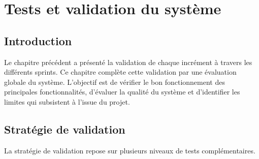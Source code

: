

\chapter{Tests et validation du système}

\label{cha:tests-validation}


\begingroup

\let\clearpage\relax

\startcontents[chapters]


\endgroup

\newpage


\section*{Introduction}

\justifying



Le chapitre précédent a présenté la validation de chaque incrément à travers les différents sprints. Ce chapitre complète cette validation par une évaluation globale du système. L'objectif est de vérifier le bon fonctionnement des principales fonctionnalités, d'évaluer la qualité du système et d'identifier les limites qui subsistent à l'issue du projet.


\section{Stratégie de validation}


La stratégie de validation repose sur plusieurs niveaux de tests complémentaires.


